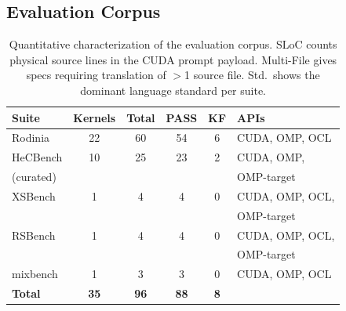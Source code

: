 \documentclass{article}
\begin{document}
\subsection{Evaluation Corpus}
\label{sec:eval-corpus}

\begin{table}[!htbp]
\parbox{.45\linewidth}{
\centering
\caption{Suite summary showing total specs, verified PASS, KNOWN\_FAIL (KF), and API coverage for each of the five benchmark suites.}
\label{tab:suite-summary}
\small
\begin{tabular}{@{}lccccl@{}}
\toprule
Suite & Kernels & Total & PASS & KF & APIs \\
\midrule
Rodinia & 22 & 60 & 54 & 6 & CUDA, OMP, OCL \\
HeCBench & 10 & 25 & 23 & 2 & CUDA, OMP, \\
(curated) &   &    &    &   & OMP-target \\
XSBench & 1 & 4 & 4 & 0 & CUDA, OMP, OCL, \\
&   &    &    &   & OMP-target \\
RSBench & 1 & 4 & 4 & 0 & CUDA, OMP, OCL, \\
&   &    &    &   & OMP-target \\
mixbench & 1 & 3 & 3 & 0 & CUDA, OMP, OCL \\
\midrule
\textbf{Total} & \textbf{35} & \textbf{96} & \textbf{88} & \textbf{8} & \\
\bottomrule
\end{tabular}
}
\hfill
\parbox{.45\linewidth}{
\centering
\caption{Quantitative characterization of the evaluation corpus. SLoC counts physical source lines in the CUDA prompt payload. Multi-File gives specs requiring translation of $>$1 source file. Std.\ shows the dominant language standard per suite.}
\label{tab:benchmark-characterization}
\small
}
\end{table}
\end{document}

